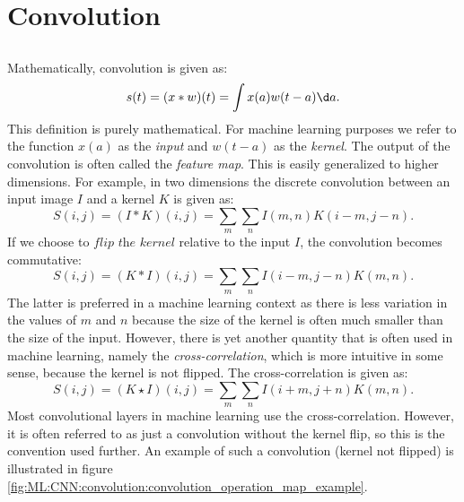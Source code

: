 %
%

\section{Convolution}
    \subsection{}
        Mathematically, convolution is given as:
        \begin{equation}\label{eq:ML:CNN:convolution:basic_defintion}
            s(t) = (x * w)(t) = \int x(a)w(t-a)\d a.
        \end{equation}
        This definition is purely mathematical. For machine learning purposes we refer to the function $x(a)$ as the \textit{input} and $w(t-a)$ as the \textit{kernel}. The output of the convolution is often called the \textit{feature map}. This is easily generalized to higher dimensions. For example, in two dimensions the discrete convolution between an input image $I$ and a kernel $K$ is given as:
        \begin{equation}\label{eq:ML:CNN:convolution:discrete_convolution}
            S(i,j) = (I * K)(i,j) = \sum_m\sum_n I(m,n)K(i-m,j-n).
        \end{equation}
        If we choose to $\textit{flip the kernel}$ relative to the input $I$, the convolution becomes commutative:
        \begin{equation}\label{eq:ML:CNN:convolution:discrete_convolution_commutative}
            S(i,j) = (K * I)(i,j) = \sum_m\sum_n I(i-m,j-n)K(m,n).
        \end{equation}
        The latter is preferred in a machine learning context as there is less variation in the values of $m$ and $n$ because the size of the kernel is often much smaller than the size of the input. However, there is yet another quantity that is often used in machine learning, namely the \textit{cross-correlation}, which is more intuitive in some sense, because the kernel is not flipped. The cross-correlation is given as:
        \begin{equation}\label{eq:ML:CNN:convolution:cross_correlation}
            S(i,j) = (K \star I)(i,j) = \sum_m\sum_n I(i+m,j+n)K(m,n).
        \end{equation}
        Most convolutional layers in machine learning use the cross-correlation. However, it is often referred to as just a convolution without the kernel flip, so this is the convention used further. An example of such a convolution (kernel not flipped) is illustrated in figure \ref{fig:ML:CNN:convolution:convolution_operation_map_example}.

